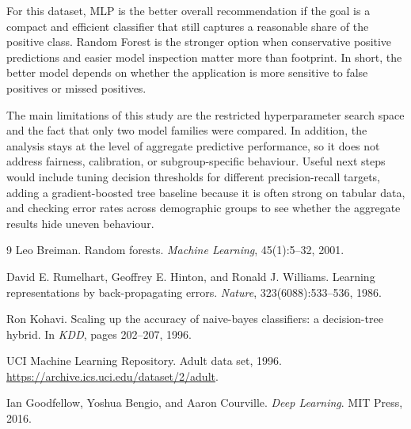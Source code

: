 \documentclass[10pt,twocolumn,letterpaper]{article}
\begin{document}
For this dataset, MLP is the better overall recommendation if the goal is a compact and efficient classifier that still captures a reasonable share of the positive class. Random Forest is the stronger option when conservative positive predictions and easier model inspection matter more than footprint. In short, the better model depends on whether the application is more sensitive to false positives or missed positives.

The main limitations of this study are the restricted hyperparameter search space and the fact that only two model families were compared. In addition, the analysis stays at the level of aggregate predictive performance, so it does not address fairness, calibration, or subgroup-specific behaviour. Useful next steps would include tuning decision thresholds for different precision-recall targets, adding a gradient-boosted tree baseline because it is often strong on tabular data, and checking error rates across demographic groups to see whether the aggregate results hide uneven behaviour.

\begin{thebibliography}{9}\setlength{\itemsep}{0pt}
Leo Breiman.
\newblock Random forests.
\newblock \emph{Machine Learning}, 45(1):5--32, 2001.

David E. Rumelhart, Geoffrey E. Hinton, and Ronald J. Williams.
\newblock Learning representations by back-propagating errors.
\newblock \emph{Nature}, 323(6088):533--536, 1986.

Ron Kohavi.
\newblock Scaling up the accuracy of naive-bayes classifiers: a decision-tree hybrid.
\newblock In \emph{KDD}, pages 202--207, 1996.

UCI Machine Learning Repository.
\newblock Adult data set, 1996.
\newblock \url{https://archive.ics.uci.edu/dataset/2/adult}.

Ian Goodfellow, Yoshua Bengio, and Aaron Courville.
\newblock \emph{Deep Learning}.
\newblock MIT Press, 2016.
\end{thebibliography}
\end{document}
